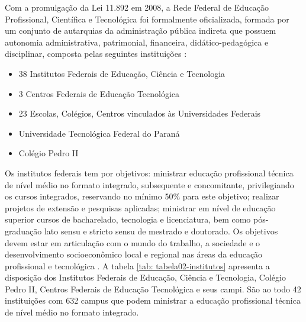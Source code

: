 Com a promulgação da Lei 11.892 em 2008, a Rede Federal de Educação Profissional, Científica e Tecnológica foi formalmente oficializada, formada por um conjunto de autarquias da administração pública indireta que possuem autonomia administrativa, patrimonial, financeira, didático-pedagógica e disciplinar, composta pelas seguintes instituições \cite{brasil2008}:

\begin{itemize}
    \item 38 Institutos Federais de Educação, Ciência e Tecnologia
    \item 3 Centros Federais de Educação Tecnológica
    \item 23 Escolas, Colégios, Centros vinculados às Universidades Federais
    \item Universidade Tecnológica Federal do Paraná
    \item Colégio Pedro II
\end{itemize}

Os institutos federais tem por objetivos: ministrar educação profissional técnica de nível médio no formato integrado, subsequente e concomitante,  privilegiando os cursos integrados, reservando no mínimo 50\% para este objetivo; realizar projetos de extensão e pesquisas aplicadas; ministrar em nível de educação superior cursos de bacharelado, tecnologia e licenciatura, bem como pós-graduação lato sensu e stricto sensu de mestrado e doutorado. Os objetivos devem estar em articulação com o mundo do trabalho, a sociedade e o desenvolvimento socioeconômico local e regional nas áreas da educação profissional e tecnológica \cite{brasil2008}. A tabela \ref{tab: tabela02-institutos} apresenta a disposição dos Institutos Federais de Educação, Ciência e Tecnologia, Colégio Pedro II, Centros Federais de Educação Tecnológica e seus campi. São ao todo 42 instituições com 632 campus que podem ministrar a educação profissional técnica de nível médio no formato integrado.

